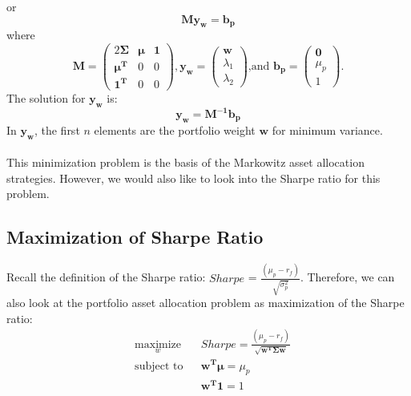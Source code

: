 \documentclass[12pt,titlepage,letter]{article}
\begin{document}
			or 
			$$
				\mathbf{My_w} = \mathbf{b_p}
			$$
			where
			\begin{equation*}
				\mathbf{M} = \begin{pmatrix} 
					2\mathbf{\Sigma} & \pmb{\mu} & \mathbf{1} \\ 
					\pmb{\mu^T} & 0 & 0 \\ 
					\pmb{1^T} & 0 & 0 
				\end{pmatrix}, 
				\mathbf{y_w}=\begin{pmatrix}
					\mathbf{w} \\ \lambda_1 \\ \lambda_2
				\end{pmatrix} 
				\text{,and }
				\mathbf{b_p} = \begin{pmatrix}
					\mathbf{0} \\ \mu_p \\ 1
				\end{pmatrix}.
			\end{equation*}
			The solution for $\mathbf{y_w}$ is: 
			\begin{equation}
				\mathbf{y_w} = \mathbf{M^{-1}b_p}
			\end{equation}
			In $\mathbf{y_w}$, the first $n$ elements are the portfolio weight $\mathbf{w}$ for minimum variance. \\ \\

			This minimization problem is the basis of the Markowitz asset allocation strategies. However, we would also like to look into the Sharpe ratio for this problem. \\

	\subsection{Maximization of Sharpe Ratio}
		Recall the definition of the Sharpe ratio: $Sharpe$ = $\frac{(\mu_p - r_f)}{\sqrt{\sigma_p^2}}$. Therefore, we can also look at the portfolio asset allocation problem as maximization of the Sharpe ratio: 
		\begin{equation}
			\begin{aligned}
				& \underset{w}{\text{maximize}}
				& & Sharpe = \frac{(\mu_p - r_f)}{\sqrt{\mathbf{w^T\Sigma w}}} \\
				& \text{subject to}
				& & \mathbf{w^T}\pmb{\mu} = \mu_p \\
				&&& \mathbf{w^T1}=1
			\end{aligned}
		\end{equation}
\end{document}
